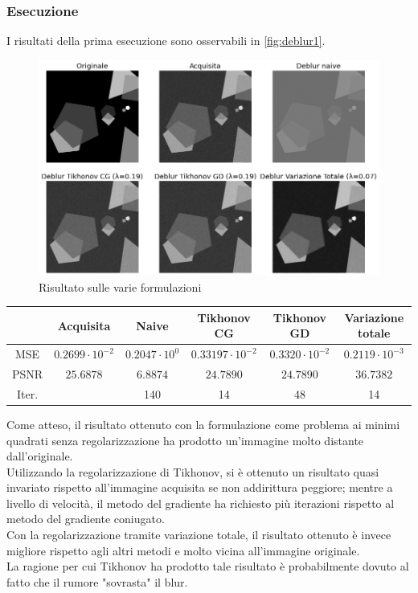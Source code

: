 \documentclass[11pt]{article}
\begin{document}
\subsubsection{Esecuzione}
I risultati della prima esecuzione sono osservabili in \autoref{fig:deblur1}.\\
\begin{figure}[H]
    \centering
    \includegraphics[width=13cm]{esecuzione/1/deblur.png}
    \caption{Risultato sulle varie formulazioni}
    \label{fig:deblur1}
\end{figure}

\begin{center}
    \begin{tabular}{ |c|c|c|c|c|c| }
    \hline
    & Acquisita & Naive & Tikhonov CG & Tikhonov GD & Variazione totale \\ 
    \hline
    MSE & $0.2699 \cdot 10^{-2}$ & $0.2047 \cdot 10^{0}$ & $0.33197 \cdot 10^{-2}$ & $0.3320 \cdot 10^{-2}$ & $0.2119 \cdot 10^{-3}$ \\ 
    PSNR & $25.6878$ & $6.8874$ & $24.7890$ & $24.7890$ & $36.7382$ \\ 
    Iter. & & 140 & 14 & 48 & 14 \\ 
    \hline
    \end{tabular}
\end{center}

Come atteso, il risultato ottenuto con la formulazione come problema ai minimi quadrati senza regolarizzazione ha prodotto un'immagine molto distante dall'originale.\\
Utilizzando la regolarizzazione di Tikhonov, si è ottenuto un risultato quasi invariato rispetto all'immagine acquisita se non addirittura peggiore; mentre a livello di velocità, il metodo del gradiente ha richiesto più iterazioni rispetto al metodo del gradiente coniugato.\\
Con la regolarizzazione tramite variazione totale, il risultato ottenuto è invece migliore rispetto agli altri metodi e molto vicina all'immagine originale.\\
La ragione per cui Tikhonov ha prodotto tale risultato è probabilmente dovuto al fatto che il rumore "sovrasta" il blur.
\end{document}
